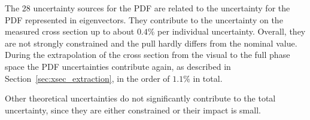 
 The 28 uncertainty sources for the PDF are related to the uncertainty for the PDF represented in eigenvectors.
 They contribute to the uncertainty on the measured cross section up to about $0.4\%$ per individual uncertainty. Overall, they are not strongly constrained and the pull hardly differs from the nominal value.
 During the extrapolation of the cross section from the visual to the full phase space the PDF uncertainties contribute again, as described in Section~\ref{sec:xsec_extraction}, in the order of $1.1  \%$ in total.

 Other theoretical uncertainties do not significantly contribute to the total uncertainty, since they are either constrained or their impact is small.





